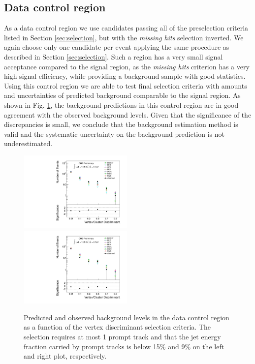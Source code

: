 \subsection{Data control region}
\label{subsec:bkgCtrl}

As a data control region we use candidates passing all of the preselection criteria listed in Section
 \ref{sec:selection}, but with the {\it missing hits} selection inverted. We again choose only 
 one candidate per event applying the same procedure as described in Section \ref{sec:selection}.
 Such a region has a very small 
signal acceptance compared to the signal region, as the {\it missing hits} criterion has a very high signal 
efficiency, while providing a
background sample with good statistics. Using this control region we are able to test final selection
criteria with amounts and uncertainties of predicted background comparable to the signal region. 
 As shown in Fig. \ref{fig:bkg_NMiss}, 
the background predictions in this control region are in good agreement 
with the observed background levels. Given that the significance
of the discrepancies is small, we conclude
that the background estimation method is valid and the systematic uncertainty on the background
 prediction is not underestimated.

\begin{figure}[htbp]
\centering
\includegraphics[width=0.495\textwidth]{plots/background/bkg_NMiss1.pdf}
\includegraphics[width=0.495\textwidth]{plots/background/bkg_NMiss2.pdf}
\caption{Predicted and observed background levels in the data control region as a function of the vertex
discriminant selection criteria. The selection requires at most 1 prompt track and that the jet energy fraction carried by prompt tracks is
below 15\% and 9\% on the left and right plot, respectively.\label{fig:bkg_NMiss}}
\end{figure}

